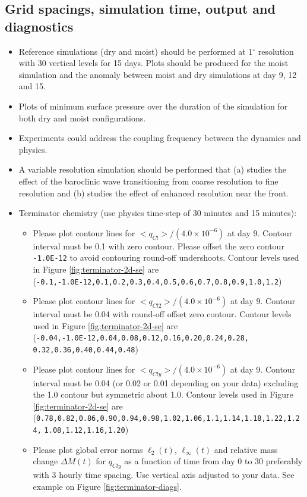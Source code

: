 \documentclass[times,doublespace]{fldauth}
\begin{document}
\subsection{Grid spacings, simulation time, output and diagnostics}

\begin{itemize}
\item Reference simulations (dry and moist) should be performed at 1$^\circ$ resolution with 30 vertical levels for 15 days.  Plots should be produced for the moist simulation and the anomaly between moist and dry simulations at day 9, 12 and 15.
\item Plots of minimum surface pressure over the duration of the simulation for both dry and moist configurations.
\item Experiments could address the coupling frequency between the dynamics and physics.
\item A variable resolution simulation should be performed that (a) studies the effect of the baroclinic wave transitioning from coarse resolution to fine resolution and (b) studies the effect of enhanced resolution near the front.
\item Terminator chemistry (use physics time-step of 30 minutes and 15 minutes): 
\begin{itemize}
\item Please plot contour lines for $<q_{Cl}>/(4.0\times 10^{-6})$ at day 9. Contour interval must be 0.1 with zero contour. Please offset the zero contour \verb+-1.0E-12+ to avoid contouring round-off undershoots. Contour levels used in Figure \ref{fig:terminator-2d-se} are\\
(\verb+-0.1,-1.0E-12,0.1,0.2,0.3,0.4,0.5,0.6,0.7,0.8,0.9,1.0,1.2+)
\item Please plot contour lines for $<q_{Cl2}>/(4.0\times 10^{-6})$ at day 9. Contour interval must be 0.04 with round-off offset zero contour.  Contour levels used in Figure \ref{fig:terminator-2d-se} are\\
(\verb+-0.04,-1.0E-12,0.04,0.08,0.12,0.16,0.20,0.24,0.28,+\\
\verb+0.32,0.36,0.40,0.44,0.48+)
\item Please plot contour lines for $<q_{Cly}>/(4.0\times 10^{-6})$ at day 9. Contour interval must be 0.04 (or 0.02 or 0.01 depending on your data) excluding the 1.0 contour but symmetric about 1.0. Contour levels used in Figure \ref{fig:terminator-2d-se} are\\
(\verb+0.78,0.82,0.86,0.90,0.94,0.98,1.02,1.06,1.1,1.14,1.18,1.22,1.24,+
\verb+1.08,1.12,1.16,1.20+)
\item Please plot global error norms $\ell_2(t)$, $\ell_\infty(t)$ and relative mass change $\Delta M(t)$ for $q_{Cly}$ as a function of time from day 0 to 30 preferably with 3 hourly time spacing. Use vertical axis adjusted to your data. See example on Figure \ref{fig:terminator-diags}.
\end{itemize}
\end{itemize}
\end{document}
